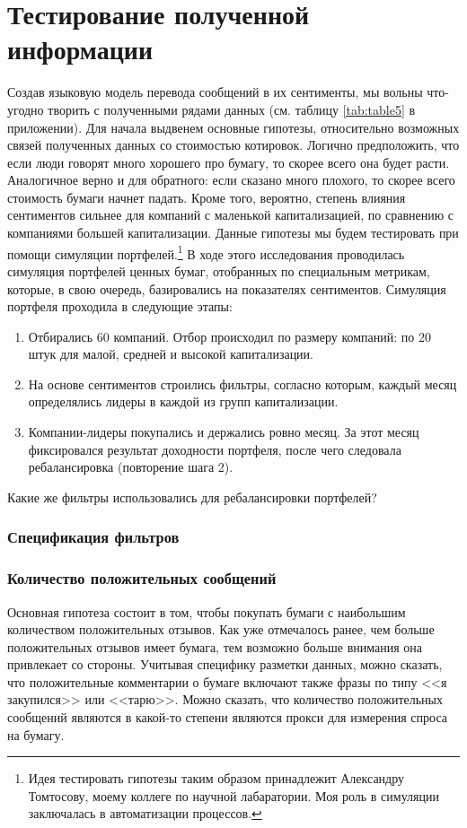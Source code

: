\documentclass{article}
\begin{document}
\section{Тестирование полученной информации}
Создав языковую модель перевода сообщений в их сентименты, мы вольны что-угодно творить с полученными рядами данных (см. таблицу \ref{tab:table5} в приложении). Для начала выдвенем основные гипотезы, относительно возможных связей полученных данных со стоимостью котировок. Логично предположить, что если люди говорят много хорошего про бумагу, то скорее всего она будет расти. Аналогичное верно и для обратного: если сказано много плохого, то скорее всего стоимость бумаги начнет падать. Кроме того, вероятно, степень влияния сентиментов сильнее для компаний с маленькой капитализацией, по сравнению с компаниями большей капитализации. Данные гипотезы мы будем тестировать при помощи симуляции портфелей.\footnote{Идея тестировать гипотезы таким образом принадлежит Александру Томтосову, моему коллеге по научной лабаратории. Моя роль в симуляции заключалась в автоматизации процессов.}
В ходе этого исследования проводилась симуляция портфелей ценных бумаг, отобранных по специальным метрикам, которые, в свою очередь, базировались на показателях сентиментов. Симуляция портфеля проходила в следующие этапы:

\begin{enumerate}
	\item Отбирались 60 компаний. Отбор происходил по размеру компаний: по 20 штук для малой, средней и высокой капитализации.
	\item На основе сентиментов строились фильтры, согласно которым, каждый месяц определялись лидеры в каждой из групп капитализации.
	\item Компании-лидеры покупались и держались ровно месяц. За этот месяц фиксировался результат доходности портфеля, после чего следовала ребалансировка (повторение шага 2).
\end{enumerate}

Какие же фильтры использовались для ребалансировки портфелей?
\subsubsection*{Спецификация фильтров}
\subsubsection{Количество положительных сообщений} Основная гипотеза состоит в том, чтобы покупать бумаги с наибольшим количеством положительных отзывов. Как уже отмечалось ранее, чем больше положительных отзывов имеет бумага, тем возможно больше внимания она привлекает со стороны. Учитывая специфику разметки данных, можно сказать, что положительные комментарии о бумаге включают также фразы по типу <<я закупился>> или <<тарю>>. Можно сказать, что количество положительных сообщений являются в какой-то степени являются прокси для измерения спроса на бумагу. 
\end{document}
